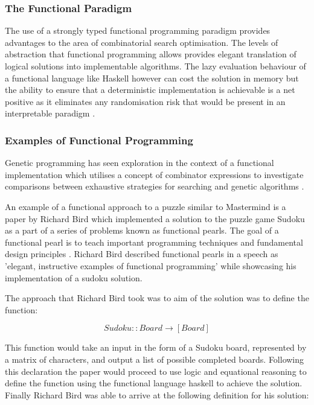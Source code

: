 \documentclass[11pt]{article}  %
\theoremstyle{definition}
\theoremstyle{remark}
\begin{document}
\subsubsection {The Functional Paradigm}

The use of a strongly typed functional programming paradigm provides advantages to the area of combinatorial search optimisation. The levels of abstraction that functional programming allows provides elegant translation of logical solutions into implementable algorithms. The lazy evaluation behaviour of a functional language like Haskell however can cost the solution in memory but the ability to ensure that a deterministic implementation is achievable is a net positive as it eliminates any randomisation risk that would be present in an interpretable paradigm \cite {Practical Haskell}.

\subsubsection {Examples of Functional Programming}

Genetic programming has seen exploration in the context of a functional implementation which utilises a concept of combinator expressions to investigate comparisons between exhaustive strategies for searching and genetic algorithms \cite {Functional Genetics}.

An example of a functional approach to a puzzle similar to Mastermind is a paper by Richard Bird which implemented a solution to the puzzle game Sudoku as a part of a series of problems known as functional pearls. The goal of a functional pearl is to teach important programming techniques and fundamental design principles \cite{Pearls}. Richard Bird described functional pearls in a speech as 'elegant, instructive examples of functional programming' while showcasing his implementation of a sudoku solution\cite {R. Bird Speech}.


The approach that Richard Bird took was to aim of the solution was to define the function:

\[ Sudoku :: Board \rightarrow [Board]\]

This function would take an input in the form of a Sudoku board, represented by a matrix of characters, and output a list of possible completed boards. Following this declaration the paper would proceed to use logic and equational reasoning to define the function using the functional language haskell to achieve the solution. Finally Richard Bird was able to arrive at the following definition for his solution:
\end{document}
